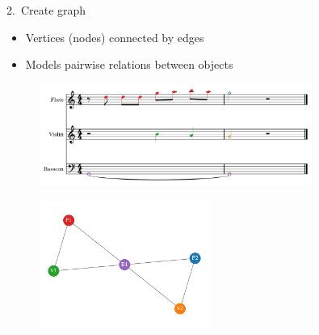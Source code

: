 \documentclass[handout]{beamer}
\begin{document}
\begin{frame}{2.\ Create graph}
    \begin{itemize}
        \item Vertices (nodes) connected by edges
        \item Models pairwise relations between objects
    \end{itemize}
    \begin{figure}
        \includegraphics[width=0.8\textwidth]{../Figures/toy-1.png}
    \end{figure}
    \pause
    \begin{figure}
        \includegraphics[width=0.5\textwidth]{../Figures/toy_graph.pdf}
    \end{figure}

\end{frame}
\end{document}
